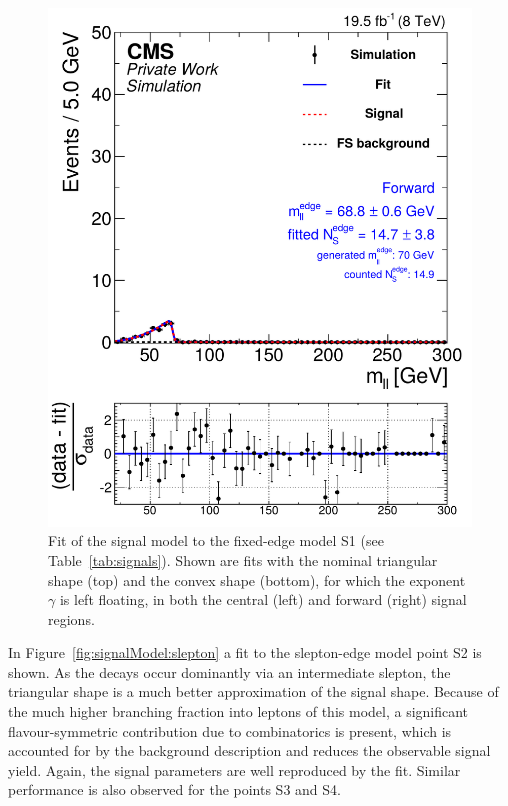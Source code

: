 \begin{figure}[hbp]
\begin{minipage}[t]{0.49\textwidth}
    \includegraphics[width=\textwidth]{plots/results/fit/mcFits/shapeIllustrationKX4_SignalInclusive_Combined_Full2012_KX4_MC_edge_400_150_80_Forward.pdf}
  \end{minipage}
  \caption{Fit of the signal model to the fixed-edge model S1 (see Table~\ref{tab:signals}). Shown are fits with the nominal triangular shape (top) and the convex shape (bottom), for which the exponent $\gamma$ is left floating, in both the central (left) and forward (right) signal regions.}
  \label{fig:signalModel:edge}
\end{figure}

In Figure~\ref{fig:signalModel:slepton} a fit to the slepton-edge model point S2 is shown. As the decays occur dominantly via an intermediate slepton, the triangular shape is a much better approximation of the signal shape. Because of the much higher branching fraction into leptons of this model, a significant flavour-symmetric contribution due to combinatorics is present, which is accounted for by the background description and reduces the observable signal yield. Again, the signal parameters are well reproduced by the fit. Similar performance is also observed for the points S3 and S4. 

